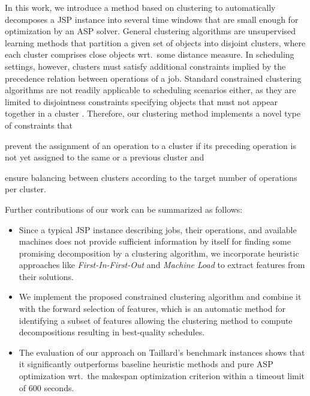 \documentclass[runningheads]{llncs}
\begin{document}
In this work, we introduce a method based on clustering to automatically decomposes a JSP instance into several time windows that are small enough for optimization by an ASP solver.
General clustering algorithms are unsupervised learning methods that partition a given set of objects into disjoint clusters, where each cluster comprises close objects wrt.\ some distance measure. 
In scheduling settings, however, clusters must satisfy additional constraints implied by the precedence relation between operations of a job. Standard constrained clustering algorithms are not readily applicable to scheduling scenarios either, as they are limited to disjointness constraints specifying objects that must not appear together in a cluster \cite{zhang2019framework,wagstaff2001constrained,ding2020unified}. 
Therefore, our clustering method implements a novel type of constraints that
\begin{enumerate*}[label=\emph{(\roman*)}]
  \item prevent the assignment of an operation to a cluster if its preceding operation is not yet assigned to the same or a previous cluster and
  \item ensure balancing between clusters according to the target number of operations per cluster.
\end{enumerate*}
Further contributions of our work can be summarized as follows:
\begin{itemize}
  \item Since a typical JSP instance describing jobs, their operations, and available machines does not provide sufficient information by itself for finding some promising decomposition by a clustering algorithm, we incorporate heuristic approaches like \textit{First-In-First-Out} and \textit{Machine Load} to extract features from their solutions.
  \item We implement the proposed constrained clustering algorithm and combine it with the forward selection of features, which is an automatic method for identifying a subset of features allowing the clustering method to compute decompositions resulting in best-quality schedules.
  \item The evaluation of our approach on Taillard's benchmark instances \cite{taillard1993benchmarks} shows that it significantly outperforms baseline heuristic methods and pure ASP optimization wrt.\ the makespan optimization criterion within a timeout limit of 600 seconds.
\end{itemize}
\end{document}
